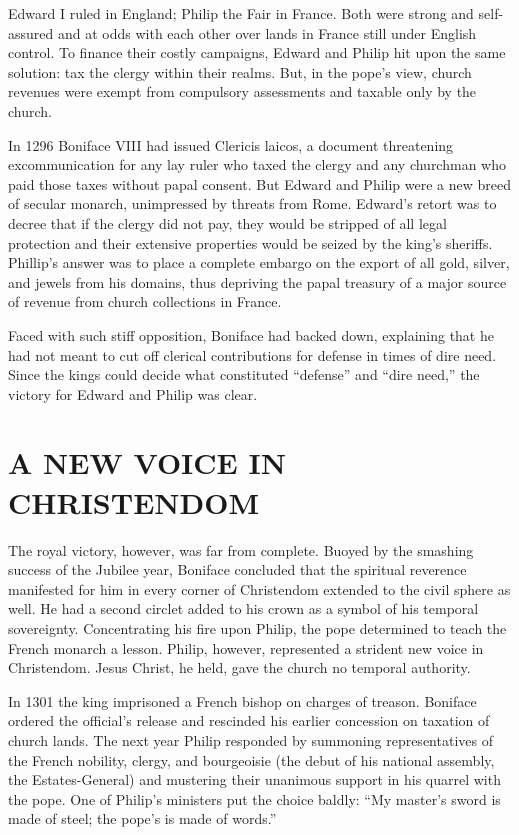 Edward I ruled in England; Philip the Fair in France. Both were strong and self-assured and at odds
with each other over lands in France still under English control. To finance their costly campaigns,
Edward and Philip hit upon the same solution: tax the clergy within their realms. But, in the pope’s
view, church revenues were exempt from compulsory assessments and taxable only by the church.

In 1296 Boniface VIII had issued Clericis laicos, a document threatening excommunication for any lay
ruler who taxed the clergy and any churchman who paid those taxes without papal consent. But Edward
and Philip were a new breed of secular monarch, unimpressed by threats from Rome. Edward’s retort
was to decree that if the clergy did not pay, they would be stripped of all legal protection and
their extensive properties would be seized by the king’s sheriffs. Phillip’s answer was to place a
complete embargo on the export of all gold, silver, and jewels from his domains, thus depriving the
papal treasury of a major source of revenue from church collections in France.

Faced with such stiff opposition, Boniface had backed down, explaining that he had not meant to cut
off clerical contributions for defense in times of dire need. Since the kings could decide what
constituted “defense” and “dire need,” the victory for Edward and Philip was clear.

\section{A NEW VOICE IN CHRISTENDOM}

The royal victory, however, was far from complete. Buoyed by the smashing success of the Jubilee
year, Boniface concluded that the spiritual reverence manifested for him in every corner of
Christendom extended to the civil sphere as well. He had a second circlet added to his crown as a
symbol of his temporal sovereignty. Concentrating his fire upon Philip, the pope determined to teach
the French monarch a lesson. Philip, however, represented a strident new voice in Christendom. Jesus
Christ, he held, gave the church no temporal authority.

In 1301 the king imprisoned a French bishop on charges of treason. Boniface ordered the official’s
release and rescinded his earlier concession on taxation of church lands. The next year Philip
responded by summoning representatives of the French nobility, clergy, and bourgeoisie (the debut of
his national assembly, the Estates-General) and mustering their unanimous support in his quarrel
with the pope. One of Philip’s ministers put the choice baldly: “My master’s sword is made of steel;
the pope’s is made of words.”


